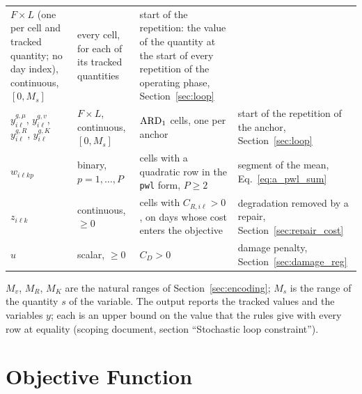 \begin{longtable}{@{}L{2.3cm}L{2.6cm}L{4.2cm}L{5.4cm}@{}}
  $F \times L$ (one per cell and tracked quantity; no day index), continuous,
  $[0, M_s]$ & every cell, for each of its tracked quantities &
  start of the repetition: the value of the quantity at the start of every repetition of
  the operating phase, Section~\ref{sec:loop} \\
$y^{g,\mu}_{i\ell}$, $y^{g,v}_{i\ell}$, $y^{g,R}_{i\ell}$, $y^{g,K}_{i\ell}$ &
  $F \times L$, continuous, $[0, M_s]$ & $\mathrm{ARD}_{1}$ cells, one per anchor &
  start of the repetition of the anchor, Section~\ref{sec:loop} \\
$w_{i\ell kp}$ & binary, $p = 1, \ldots, P$ & cells with a quadratic row in the
  \texttt{pwl} form, $P \geq 2$ & segment of the mean, Eq.~\eqref{eq:a_pwl_sum} \\
$z_{i\ell k}$ & continuous, $\geq 0$ & cells with $C_{R,i\ell} > 0$, on days whose cost
  enters the objective & degradation removed by a repair,
  Section~\ref{sec:repair_cost} \\
$u$ & scalar, $\geq 0$ & $C_D > 0$ & damage penalty,
  Section~\ref{sec:damage_reg} \\
\bottomrule
\end{longtable}
\endgroup

$M_v$, $M_R$, $M_K$ are the natural ranges of Section~\ref{sec:encoding}; $M_s$ is the
range of the quantity $s$ of the variable. The output
reports the tracked values and the variables $y$; each is an upper bound on the value that the rules give
with every row at equality (scoping document, section ``Stochastic loop
constraint'').

\section{Objective Function}
\label{sec:objective}

